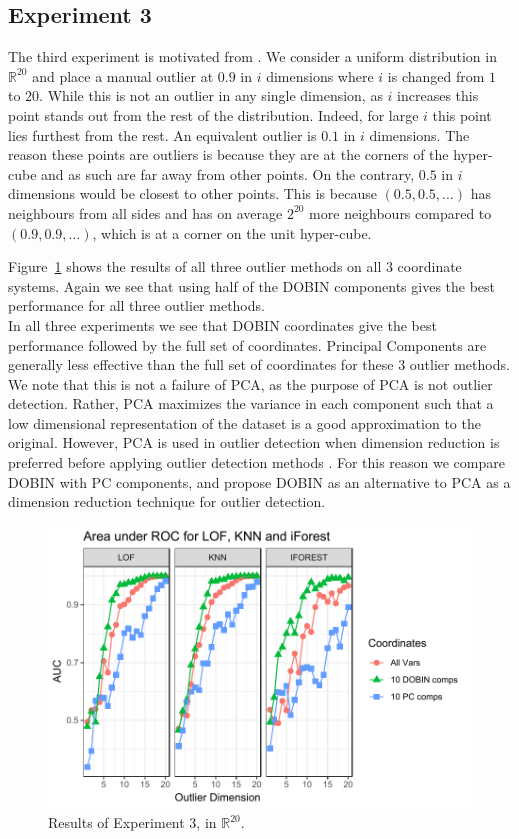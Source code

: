 \documentclass[11pt]{article}
\begin{document}
\subsection{Experiment 3}
The third experiment is motivated from \cite{zimek2012survey}. We consider a uniform distribution in $\mathbb{R}^{20}$ and place a manual outlier at $0.9$ in $i$ dimensions where $i$ is changed from $1$ to $20$. While this is not an outlier in any single dimension, as $i$ increases this point stands out from the rest of the distribution. Indeed, for large $i$ this  point lies furthest from the rest. An equivalent outlier is $0.1$ in $i$ dimensions. The reason these points are outliers is because they are at the corners of the hyper-cube and as such are far away from other points. On the contrary, $0.5$ in $i$ dimensions would be closest to other points. This is because $(0.5, 0.5, \ldots)$ has neighbours from all sides and has on average $2^{20}$ more neighbours compared to $(0.9, 0.9, \ldots)$, which is at a corner on the unit hyper-cube.  

Figure~\ref{fig:Exp3} shows the results of all three outlier methods on all $3$ coordinate systems. Again we see that using half of the DOBIN components gives the best performance for all three outlier methods.    \\

In all three experiments we see that DOBIN coordinates give the best performance followed by the full set of coordinates. Principal Components are generally less effective than the full set of coordinates for these $3$ outlier methods. We note that this is not a failure of PCA, as the purpose of PCA is not outlier detection. Rather, PCA maximizes the variance in each component such that a low dimensional representation of the dataset is a good approximation to the original. However, PCA is used in outlier detection when dimension reduction is preferred before applying outlier detection methods \citep{talagala2019anomaly, hyndman2015large}. For this reason we compare DOBIN with PC components, and propose DOBIN as an alternative to PCA as a dimension reduction technique for outlier detection.



\begin{figure}
	\centering
	\includegraphics[scale=0.8]{Exp3.pdf}
	\caption{Results of Experiment 3, in $\mathbb{R}^{20}$.}
	\label{fig:Exp3}
\end{figure} 
\end{document}
